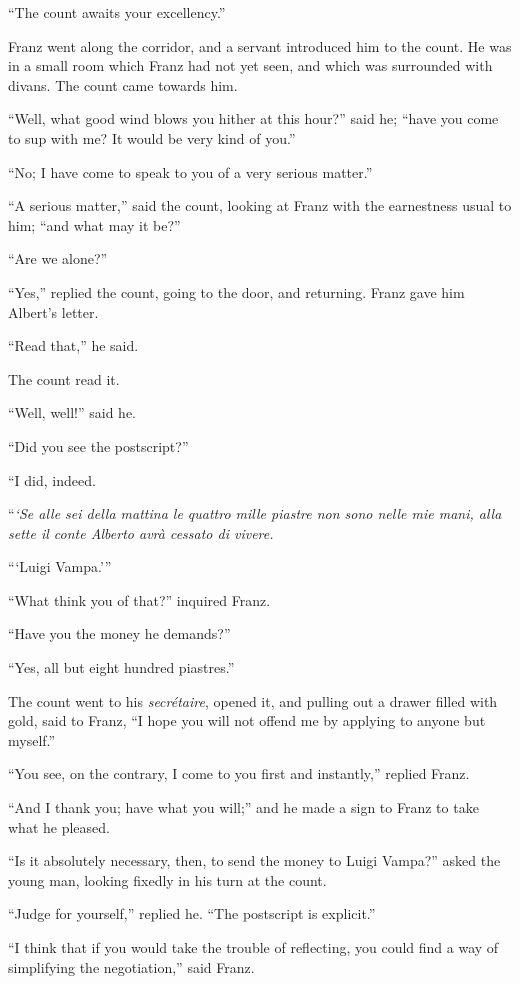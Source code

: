 “The count awaits your excellency.”

Franz went along the corridor, and a servant introduced him to the
count. He was in a small room which Franz had not yet seen, and which
was surrounded with divans. The count came towards him.

“Well, what good wind blows you hither at this hour?” said he; “have
you come to sup with me? It would be very kind of you.”

“No; I have come to speak to you of a very serious matter.”

“A serious matter,” said the count, looking at Franz with the
earnestness usual to him; “and what may it be?”

“Are we alone?”

“Yes,” replied the count, going to the door, and returning. Franz gave
him Albert’s letter.

“Read that,” he said.

The count read it.

“Well, well!” said he.

“Did you see the postscript?”

“I did, indeed.

“\textit{‘Se alle sei della mattina le quattro mille piastre non sono nelle
mie mani, alla sette il conte Alberto avrà cessato di vivere. }

“‘Luigi Vampa.’”

“What think you of that?” inquired Franz.

“Have you the money he demands?”

“Yes, all but eight hundred piastres.”

The count went to his \textit{secrétaire}, opened it, and pulling out a drawer
filled with gold, said to Franz, “I hope you will not offend me by
applying to anyone but myself.”

“You see, on the contrary, I come to you first and instantly,” replied
Franz.

“And I thank you; have what you will;” and he made a sign to Franz to
take what he pleased.

“Is it absolutely necessary, then, to send the money to Luigi Vampa?”
asked the young man, looking fixedly in his turn at the count.

“Judge for yourself,” replied he. “The postscript is explicit.”

“I think that if you would take the trouble of reflecting, you could
find a way of simplifying the negotiation,” said Franz.

